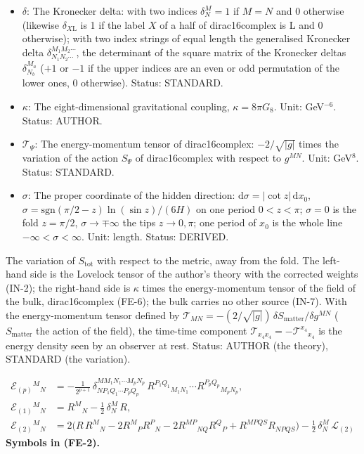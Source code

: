 \documentclass[
  10pt,
]{article}
\begin{document}
\begin{itemize}
  \(0 = -\Lambda_{\mathrm{N}} + \sum_p H^{-2p}w_{(p)}\mathcal{E}_{(p)}\)).
  Unit: GeV\(^2\). Value: \(-7H^2\); the author's original \(-10H^2\).
  Status: AUTHOR (the term), DERIVED (the value).
\item
  \(\delta\): The Kronecker delta: with two indices \(\delta^M_N = 1\)
  if \(M = N\) and 0 otherwise (likewise \(\delta_{X\mathrm{L}}\) is 1
  if the label \(X\) of a half of dirac16complex is L and 0 otherwise);
  with two index strings of equal length the generalised Kronecker delta
  \(\delta^{M_1M_2\cdots}_{N_1N_2\cdots}\), the determinant of the
  square matrix of the Kronecker deltas \(\delta^{M_a}_{N_b}\) (\(+1\)
  or \(-1\) if the upper indices are an even or odd permutation of the
  lower ones, 0 otherwise). Status: STANDARD.
\item
  \(\kappa\): The eight-dimensional gravitational coupling,
  \(\kappa = 8\pi G_8\). Unit: GeV\(^{-6}\). Status: AUTHOR.
\item
  \(\mathcal{T}_\Psi\): The energy-momentum tensor of dirac16complex:
  \(-2/\sqrt{\lvert g\rvert}\) times the variation of the action
  \(S_\Psi\) of dirac16complex with respect to \(g^{MN}\). Unit:
  GeV\(^8\). Status: STANDARD.
\item
  \(\sigma\): The proper coordinate of the hidden direction:
  \(\mathrm{d}\sigma = \lvert\cot z\rvert\,\mathrm{d}x_0\),
  \(\sigma = \mathrm{sgn}(\pi/2 - z)\ln(\sin z)/(6H)\) on one period
  \(0 < z < \pi\); \(\sigma = 0\) is the fold \(z = \pi/2\),
  \(\sigma \to \mp\infty\) the tips \(z \to 0, \pi\); one period of
  \(x_0\) is the whole line \(-\infty < \sigma < \infty\). Unit: length.
  Status: DERIVED.
\end{itemize}

The variation of \(S_{\mathrm{tot}}\) with respect to the metric, away
from the fold. The left-hand side is the Lovelock tensor of the author's
theory with the corrected weights (IN-2); the right-hand side is
\(\kappa\) times the energy-momentum tensor of the field of the bulk,
dirac16complex (FE-6); the bulk carries no other source (IN-7). With the
energy-momentum tensor defined by
\(\mathcal{T}_{MN} = -(2/\sqrt{\lvert g\rvert})\,\delta S_{\mathrm{matter}}/\delta g^{MN}\)
(\(S_{\mathrm{matter}}\) the action of the field), the time-time
component \(\mathcal{T}_{x_4x_4} = -\mathcal{T}^{x_4}{}_{x_4}\) is the
energy density seen by an observer at rest. Status: AUTHOR (the theory),
STANDARD (the variation).

\[
\begin{aligned}
\mathcal{E}_{(p)}{}^M{}_N &= -\frac{1}{2^{p+1}}\,\delta^{MM_1N_1\cdots M_pN_p}_{NP_1Q_1\cdots P_pQ_p}\,
 R^{P_1Q_1}{}_{M_1N_1}\cdots R^{P_pQ_p}{}_{M_pN_p},\\
\mathcal{E}_{(1)}{}^M{}_N &= R^M{}_N - \frac12\,\delta^M_N\,R,\\
\mathcal{E}_{(2)}{}^M{}_N &= 2\big(R\,R^M{}_N - 2R^M{}_PR^P{}_N - 2R^{MP}{}_{NQ}R^Q{}_P + R^{MPQS}R_{NPQS}\big)
 - \frac12\,\delta^M_N\,\mathcal{L}_{(2)}
\end{aligned} \tag{FE-2}
\] \textbf{Symbols in (FE-2).}
\end{document}
